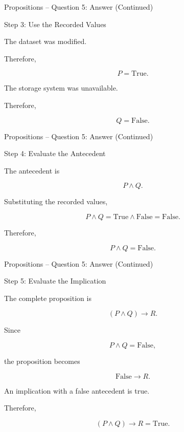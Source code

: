 
\begin{frame}{Propositions -- Question 5: Answer (Continued)}

\begin{exampleblock}{Step 3: Use the Recorded Values}

The dataset was modified.

Therefore,

$$
P=\text{True}.
$$

The storage system was unavailable.

Therefore,

$$
Q=\text{False}.
$$

\end{exampleblock}

\end{frame}


\begin{frame}{Propositions -- Question 5: Answer (Continued)}

\begin{exampleblock}{Step 4: Evaluate the Antecedent}

The antecedent is

$$
P\land Q.
$$

Substituting the recorded values,

$$
P\land Q
=
\text{True}\land\text{False}
=
\text{False}.
$$

Therefore,

$$
\boxed{P\land Q=\text{False}}.
$$

\end{exampleblock}

\end{frame}


\begin{frame}{Propositions -- Question 5: Answer (Continued)}

\begin{exampleblock}{Step 5: Evaluate the Implication}

The complete proposition is

$$
(P\land Q)\rightarrow R.
$$

Since

$$
P\land Q=\text{False},
$$

the proposition becomes

$$
\text{False}\rightarrow R.
$$

An implication with a false antecedent is true.

Therefore,

$$
\boxed{(P\land Q)\rightarrow R=\text{True}}.
$$

\end{exampleblock}

\end{frame}

